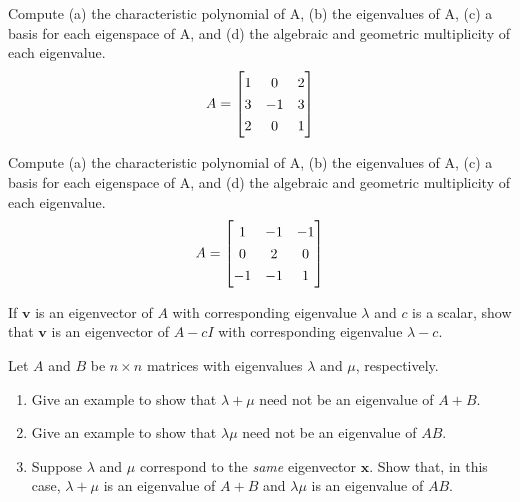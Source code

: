 \documentclass[12pt,letterpaper]{hmcpset}
\newcommand{\m}[1]{\renewcommand*{\arraystretch}{1.3} \begin{bmatrix} #1 \end{bmatrix}}
\begin{document}

\begin{problem}[4.3.6]
	Compute (a) the characteristic polynomial of A, (b) the eigenvalues of A, (c) a basis for each eigenspace of A, and (d) the algebraic and geometric multiplicity of each eigenvalue.
  $$ A = \m{1 & 0 & 2 \\ 3 & -1 & 3 \\ 2 & 0 & 1} $$
\end{problem}

\begin{solution}
\vfill
\end{solution}
\newpage

\begin{problem}[4.3.8]
	Compute (a) the characteristic polynomial of A, (b) the eigenvalues of A, (c) a basis for each eigenspace of A, and (d) the algebraic and geometric multiplicity of each eigenvalue.
  $$ A = \m{1 & -1 & -1 \\ 0 & 2 & 0 \\ -1 & -1 & 1} $$
\end{problem}

\begin{solution}
\vfill
\end{solution}
\newpage

\begin{problem}[4.3.22]
	If $\mathbf{v}$ is an eigenvector of $A$ with corresponding eigenvalue $\lambda$ and $c$ is a scalar, show that $\mathbf{v}$ is an eigenvector of $A - cI$ with corresponding eigenvalue $\lambda - c$.
\end{problem}

\begin{solution}
\vfill
\end{solution}
\newpage

\begin{problem}[4.3.24]
Let $A$ and $B$ be $n \times n$ matrices with eigenvalues $\lambda$ and $\mu$, respectively.
	\begin{enumerate}
		\item
			Give an example to show that $\lambda + \mu$ need not be an eigenvalue of $A+B$.
		\item
			Give an example to show that $\lambda\mu$ need not be an eigenvalue of $AB$.
		\item
			Suppose $\lambda$ and $\mu$ correspond to the \emph{same} eigenvector $\mathbf{x}$. Show that, in this case, $\lambda + \mu$ is an eigenvalue of $A+B$ and $\lambda\mu$ is an eigenvalue of $AB$.
	\end{enumerate}

\end{problem}
\end{document}
